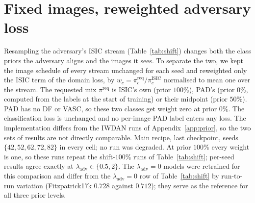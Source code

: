 \documentclass{midl}
\newcommand{\lam}{\lambda_{\mathrm{adv}}}
\begin{document}
\FloatBarrier
\section{Fixed images, reweighted adversary loss}
\label{app:reweight}

Resampling the adversary's ISIC stream (Table~\ref{tab:shift}) changes both the class priors the
adversary aligns and the images it sees. To separate the two, we kept the image schedule of every
stream unchanged for each seed and reweighted only the ISIC term of the domain loss, by
$w_c=\pi^{\mathrm{req}}_c/\pi^{\mathrm{ISIC}}_c$ normalised to mean one over the stream. The requested
mix $\pi^{\mathrm{req}}$ is ISIC's own (prior $100\%$), PAD's (prior $0\%$, computed from the
\texttt{} labels at the start of training) or their midpoint (prior $50\%$). PAD has
no DF or VASC, so these two classes get weight zero at prior $0\%$. The classification loss is
unchanged and no per-image PAD label enters any loss. The implementation differs from the IWDAN runs of
Appendix~\ref{app:prior}, so the two sets of results are not directly comparable. Main recipe, last
checkpoint, seeds $\{42,52,62,72,82\}$ in every cell; no run was degraded. At prior $100\%$ every weight
is one, so these runs repeat the shift-$100\%$ runs of Table~\ref{tab:shift}; per-seed results agree
exactly at $\lam\in\{0.5,2\}$. The $\lam=0$ models were retrained for this comparison and differ from
the $\lam=0$ row of Table~\ref{tab:shift} by run-to-run variation (Fitzpatrick17k $0.728$ against $0.712$);
they serve as the reference for all three prior levels.
\end{document}
